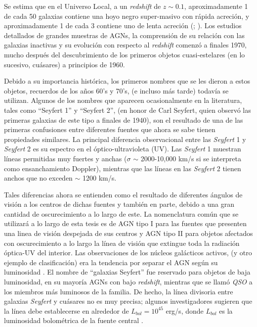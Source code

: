 \bigskip

\noindent Se estima que en el Universo Local, a un \textsl{redshift} de $z \sim 0.1$, aproximadamente 1 de cada 50
galaxias contiene una hoyo negro super-masivo con rápida acreción, y aproximadamente 1 de cada 3
contiene uno de lenta acreción (\cite{richards2006}; \cite{rosario2012}). Los estudios detallados de grandes muestras de AGNs, la comprensión de su relación con las galaxias inactivas y su evolución con respecto al \textsl{redshift} comenzó a finales
1970, mucho después del descubrimiento de los primeros objetos cuasi-estelares (en lo sucesivo, cuásares) a principios de 1960.

\bigskip

\noindent  Debido a su importancia histórica, los primeros nombres que se les dieron a estos objetos, recuerdos de los años 60's y 70's, (e incluso más tarde) todavía se utilizan. Algunos de los nombres que aparecen ocasionalmente en la literatura, tales como ``Seyfert 1'' y ``Seyfert 2'', (en honor de Carl Seyfert, quien observó las primeras galaxias de este tipo
a finales de 1940), son el resultado de una de las primeras confusiones entre diferentes fuentes que ahora se sabe tienen propiedades similares. La principal diferencia observacional entre las \textsl{Seyfert} 1 y \textsl{Seyfert} 2 es su espectro  en el óptico-ultravioleta (UV).
Las \textsl{Seyfert} 1  muestran líneas permitidas muy fuertes y anchas ($\sigma$ $\sim$ 2000-10,000 km/s si se interpreta como ensanchamiento Doppler), mientras que las líneas en las \textsl{Seyfert} 2  tienen anchos que no exceden  $\sim$ 1200 km/s.

\bigskip

\noindent Tales diferencias ahora se entienden como el resultado de diferentes ángulos de visión a los centros de dichas fuentes y
también en parte, debido a una gran cantidad de oscurecimiento a lo largo de este. La nomenclatura común que se utilizará a lo largo de esta tesis es de AGN tipo I  para las fuentes que presenten una linea de visión despejada de sus centros y AGN tipo II para objetos afectados con oscurecimiento a lo largo la línea de visión que  extingue toda la radiación óptica-UV del interior. Las observaciones de los núcleos galácticos activos, (y otro ejemplo de clasificación) era la tendencia por separar el AGN según su luminosidad \citep{urry1995}. El nombre de ``galaxias Seyfert'' fue reservado para objetos de baja luminosidad, en su mayoría AGNs con bajo \textsl{redshift}, mientras que se llamó \textsl{QSO} a los miembros más luminosos de la familia. De hecho, la línea divisoria  entre galaxias \textsl{Seyfert} y cuásares no es muy precisa; algunos investigadores sugieren que la línea debe establecerse en alrededor de
$L_{bol}=10^{45}$ erg/s, donde $L_{bol}$ es la luminosidad  bolométrica de la fuente central \citep{antonucci1993}.


